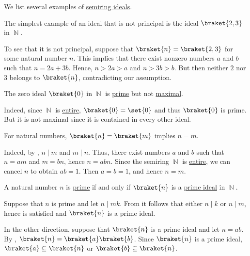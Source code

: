 \begin{example}\label{ex:def:semiring_ideal}
  We list several examples of \hyperref[def:semiring_ideal]{semiring ideals}.
  \begin{thmenum}
     The simplest example of an ideal that is not principal is the ideal \( \braket{ 2, 3 } \) in \( \BbbN \).

    To see that it is not principal, suppose that \( \braket{ n } = \braket{ 2, 3 } \) for some natural number \( n \). This implies that there exist nonzero numbers \( a \) and \( b \) such that \( n = 2a + 3b \). Hence, \( n > 2a > a \) and \( n > 3b > b \). But then neither \( 2 \) nor \( 3 \) belongs to \( \braket{ n } \), contradicting our assumption.

     The zero ideal \( \braket{ 0 } \) in \( \BbbN \) is \hyperref[def:semiring_ideal/prime]{prime} but not \hyperref[def:semiring_ideal/maximal]{maximal}.

    Indeed, since \( \BbbN \) is \hyperref[def:entire_semiring]{entire}, \( \braket{ 0 } = \set{ 0 } \) and thus \( \braket{ 0 } \) is prime. But it is not maximal since it is contained in every other ideal.

     For natural numbers, \( \braket{ n } = \braket{ m } \) implies \( n = m \).

    Indeed, by , \( n \mid m \) and \( m \mid n \). Thus, there exist numbers \( a \) and \( b \) such that \( n = am \) and \( m = bn \), hence \( n = abn \). Since the semiring \( \BbbN \) is \hyperref[def:entire_semiring]{entire}, we can cancel \( n \) to obtain \( ab = 1 \). Then \( a = b = 1 \), and hence \( n = m \).

     A natural number \( n \) is \hyperref[def:prime_number]{prime} if and only if \( \braket{n} \) is a \hyperref[def:semiring_ideal/prime]{prime ideal} in \( \BbbN \).

    Suppose that \( n \) is prime and let \( n \mid mk \). From  it follows that either \( n \mid k \) or \( n \mid m \), hence  is satisfied and \( \braket{ n } \) is a prime ideal.

    In the other direction, suppose that \( \braket{ n } \) is a prime ideal and let \( n = ab \). By , \( \braket{ n } = \braket{ a } \braket{ b } \). Since \( \braket{ n } \) is a prime ideal, \( \braket{ a } \subseteq \braket{ n } \) or \( \braket{ b } \subseteq \braket{ n } \).


\end{thmenum}
\end{example}
